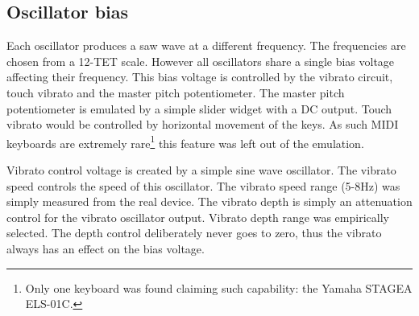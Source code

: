 \documentclass[11pt,a4paper]{article}
\begin{document}



\subsection{Oscillator bias}
\label{section:oscillator-bias}

Each oscillator produces a saw wave at a different frequency. The frequencies are chosen from a 12-TET scale. However all oscillators share a single bias voltage affecting their frequency. This bias voltage is controlled by the vibrato circuit, touch vibrato and the master pitch potentiometer. The master pitch potentiometer is emulated by a simple slider widget with a DC output. Touch vibrato would be controlled by horizontal movement of the keys. As such MIDI keyboards are extremely rare\footnote{Only one keyboard was found claiming such capability: the Yamaha STAGEA ELS-01C.} this feature was left out of the emulation.

Vibrato control voltage is created by a simple sine wave oscillator. The vibrato speed controls the speed of this oscillator. The vibrato speed range (5-8Hz) was simply measured from the real device. The vibrato depth is simply an attenuation control for the vibrato oscillator output. Vibrato depth range was empirically selected. The depth control deliberately never goes to zero, thus the vibrato always has an effect on the bias voltage.


\end{document}

